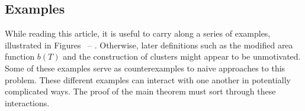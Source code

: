 \subsection{Examples}

While reading this article, it is useful to carry along a series of examples,
illustrated in Figures~ -- .
Otherwise, later definitions such as the modified area function $b(T)$
and the construction of clusters might appear to be unmotivated.  Some
of these examples serve as counterexamples to naive approaches to this
problem.  These different examples can interact with one another in
potentially complicated ways.  The proof of the main theorem must sort
through these interactions.




